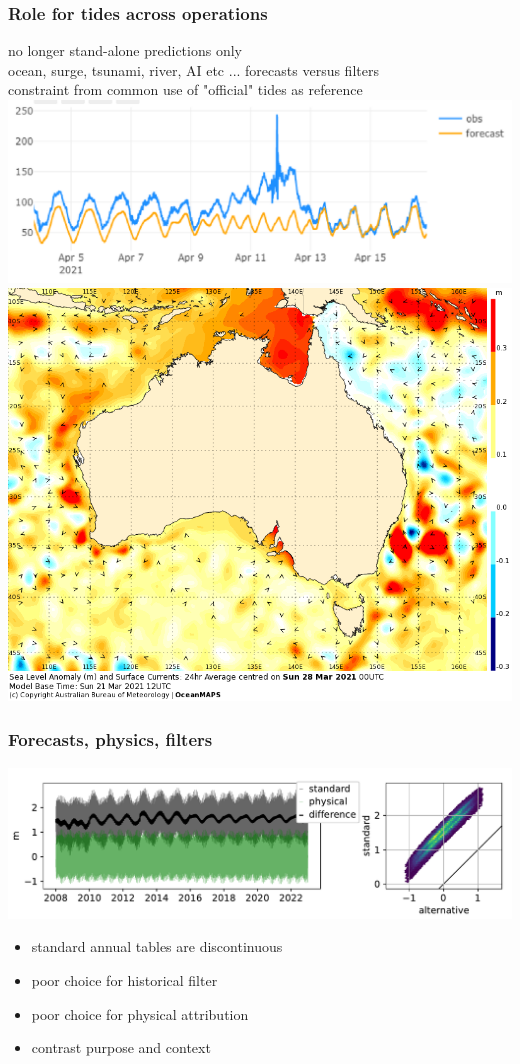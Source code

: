 \begin{frame}
\frametitle{Role for tides across operations}
\centering
no longer stand-alone predictions only\\
ocean, surge, tsunami, river, AI etc  ... forecasts versus filters\\
constraint from common use of "official" tides as reference
\vfill{}
\includegraphics[height=0.3\textheight]{figures/plots/tide_eg_gero.png}
\hfill{}
\includegraphics[height=0.3\textheight]{figures/images/IDYOC300.Aus.SLACur.168.png}
\end{frame}
\begin{frame}
\frametitle{Forecasts, physics, filters}
\centering
\includegraphics[width=\textwidth]{figures/plots/piecewiseTide_62430.pdf}
      \begin{itemize}
          \item standard annual tables are discontinuous
          \item poor choice for historical filter
          \item poor choice for physical attribution
          \item contrast purpose and context
      \end{itemize}
\end{frame}

